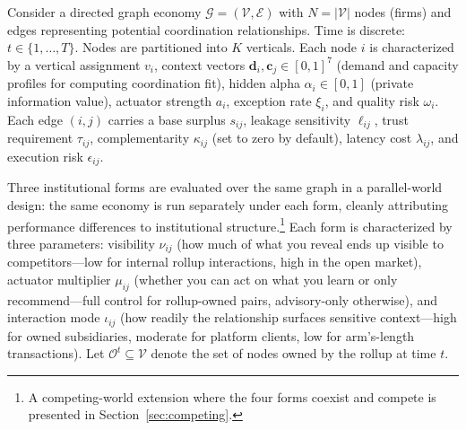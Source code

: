 \documentclass[12pt]{article}
\theoremstyle{definition}
\begin{document}
Consider a directed graph economy $\mathcal{G} = (\mathcal{V}, \mathcal{E})$ with $N = |\mathcal{V}|$ nodes (firms) and edges representing potential coordination relationships. Time is discrete: $t \in \{1, \ldots, T\}$. Nodes are partitioned into $K$ verticals. Each node $i$ is characterized by a vertical assignment $v_i$, context vectors $\mathbf{d}_i, \mathbf{c}_j \in [0,1]^7$ (demand and capacity profiles for computing coordination fit), hidden alpha $\alpha_i \in [0,1]$ (private information value), actuator strength $a_i$, exception rate $\xi_i$, and quality risk $\omega_i$. Each edge $(i,j)$ carries a base surplus $s_{ij}$, leakage sensitivity $\ell_{ij}$, trust requirement $\tau_{ij}$, complementarity $\kappa_{ij}$ (set to zero by default), latency cost $\lambda_{ij}$, and execution risk $\epsilon_{ij}$.

Three institutional forms are evaluated over the same graph in a parallel-world design: the same economy is run separately under each form, cleanly attributing performance differences to institutional structure.\footnote{A competing-world extension where the four forms coexist and compete is presented in Section~\ref{sec:competing}.} Each form is characterized by three parameters: visibility $\nu_{ij}$ (how much of what you reveal ends up visible to competitors---low for internal rollup interactions, high in the open market), actuator multiplier $\mu_{ij}$ (whether you can act on what you learn or only recommend---full control for rollup-owned pairs, advisory-only otherwise), and interaction mode $\iota_{ij}$ (how readily the relationship surfaces sensitive context---high for owned subsidiaries, moderate for platform clients, low for arm's-length transactions). Let $\mathcal{O}^t \subseteq \mathcal{V}$ denote the set of nodes owned by the rollup at time $t$.
\end{document}
